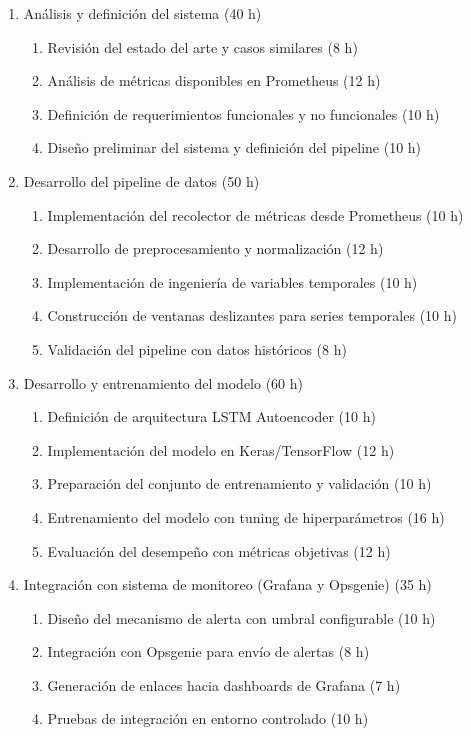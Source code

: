 \documentclass[
11pt, %
]{charter}
\begin{document}
\begin{enumerate}
\item Análisis y definición del sistema (40 h)
\begin{enumerate}
\item Revisión del estado del arte y casos similares (8 h)
\item Análisis de métricas disponibles en Prometheus (12 h)
\item Definición de requerimientos funcionales y no funcionales (10 h)
\item Diseño preliminar del sistema y definición del pipeline (10 h)
\end{enumerate}

\item Desarrollo del pipeline de datos (50 h)
\begin{enumerate}
\item Implementación del recolector de métricas desde Prometheus (10 h)
\item Desarrollo de preprocesamiento y normalización (12 h)
\item Implementación de ingeniería de variables temporales (10 h)
\item Construcción de ventanas deslizantes para series temporales (10 h)
\item Validación del pipeline con datos históricos (8 h)
\end{enumerate}

\item Desarrollo y entrenamiento del modelo (60 h)
\begin{enumerate}
\item Definición de arquitectura LSTM Autoencoder (10 h)
\item Implementación del modelo en Keras/TensorFlow (12 h)
\item Preparación del conjunto de entrenamiento y validación (10 h)
\item Entrenamiento del modelo con tuning de hiperparámetros (16 h)
\item Evaluación del desempeño con métricas objetivas (12 h)
\end{enumerate}

\item Integración con sistema de monitoreo (Grafana y Opsgenie) (35 h)
\begin{enumerate}
\item Diseño del mecanismo de alerta con umbral configurable (10 h)
\item Integración con Opsgenie para envío de alertas (8 h)
\item Generación de enlaces hacia dashboards de Grafana (7 h)
\item Pruebas de integración en entorno controlado (10 h)
\end{enumerate}


\end{enumerate}
\end{document}
